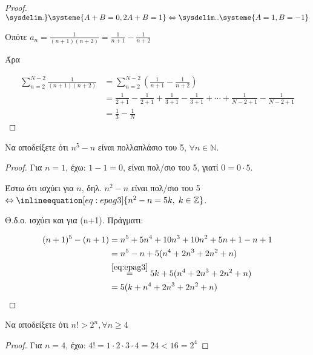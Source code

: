 \begin{multicols}{2}
\begin{enumerate}
\begin{proof}
    $  \sysdelim.\}\systeme{A+B=0,2A+B=1} \Leftrightarrow \sysdelim..
    \systeme{A=1,B=-1} $

    Οπότε $ a_{n} = \frac{1}{(n+1)(n+2)} = \frac{1}{n+1} - \frac{1}{n+2} $
    
    Άρα 
    
    \begin{align*}
        \sum_{n=2}^{N-2} \frac{1}{(n+1)(n+2)} 
        &= \sum_{n=2}^{N-2} (\frac{1}{n+1} - \frac{1}{n+2})   \\
        &= \frac{1}{2+1} - \frac{1}{2+1} + \frac{1}{3+1} - \frac{1}{3+1} +\cdots +
        \frac{1}{N-2+1} - \frac{1}{N-2+1} \\
        &= \frac{1}{3} - \frac{1}{N} 
    \end{align*}
        \end{proof}

    \item \textcolor{Col1}{Να αποδείξετε ότι $ n^{5} - n $ είναι 
            πολλαπλάσιο του 5, $ \forall n \in \mathbb{N} $.}

        \begin{proof}
            Για $ n=1 $, έχω: $ 1-1=0 $, είναι πολ/σιο του 5, γιατί $0=0\cdot 5$.

            Έστω ότι ισχύει για $n$, δηλ. $n^{2}-n $ 
                είναι πολ/σιο του 5 $
                \Leftrightarrow \inlineequation[eq:epag3]{n^{2}-n=5k, 
                \; k \in \mathbb{Z}} $.

            Θ.δ.ο. ισχύει και για (n+1). Πράγματι:

            \begin{align*}
                (n+1)^{5}-(n+1) &= n^{5}+5n^{4}+10n^{3}+10n^{2}+5n+1-n+1 \\
                                &=n^{5}-n+5(n^{4}+2n^{3}+2n^{2}+n) \\
                                &\overset{\eqref{eq:epag3}}{=} 5k 
                                + 5(n^{4}+2n^{3}+2n^{2}+n) \\ 
                                &= 5(k + n^{4}+2n^{3}+2n^{2}+n)
            \end{align*}
        \end{proof}


    \item \textcolor{Col1}{Να αποδείξετε ότι $ n! > 2^{n}, \forall n \geq 
        4 $}

        \begin{proof}
        \item {}
            Για $ n=4 $, έχω: $ 4! = 1\cdot 2 \cdot 3 \cdot 4 = 24 < 16 = 2^{4} $


\end{proof}
\end{enumerate}
\end{multicols}
